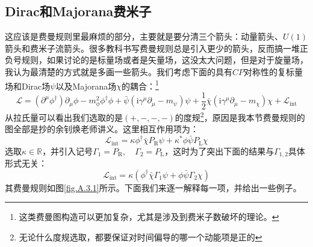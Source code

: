\subsection{Dirac和Majorana费米子}
这应该是费曼规则里最麻烦的部分，主要就是要分清三个箭头：动量箭头、$U(1)$箭头和费米子流箭头。很多教科书写费曼规则总是引入更少的箭头，反而搞一堆正负号规则，如果讨论的是标量场或者是矢量场，这没太大问题，但是对于旋量场，我认为最清楚的方式就是多画一些箭头。我们考虑下面的具有$CP$对称性的复标量场和Dirac场$\psi$以及Majorana场$\chi$的耦合：\footnote{这类费曼图构造可以更加复杂，尤其是涉及到费米子数破坏的理论。}
\begin{equation}\label{A.3.1}
	\mathcal{L}=(\partial^\mu\phi^\dagger)\partial_\mu\phi-m_\phi^2\phi^\dagger\phi+\bar{\psi}(\mathrm{i}\gamma^\mu\partial_\mu-m_\psi)\psi+\frac12\bar{\chi}(\mathrm{i}\gamma^\mu\partial_\mu-m_\chi)\chi+\mathcal{L}_\mathrm{int}
\end{equation}
从拉氏量可以看出我们选取的是$(+,-,-,-)$的度规\footnote{无论什么度规选取，都要保证对时间偏导的哪一个动能项是正的}，原因是我本节费曼规则的图全部是抄的余钊焕老师讲义。这里相互作用项为：
\begin{equation}
	\mathcal{L}_\mathrm{int}=\kappa\phi^\dagger\bar{\chi}P_\mathrm{R}\psi+\kappa^*\phi\bar{\psi}P_\mathrm{L}\chi 
\end{equation}
选取$\kappa\in\mathbb{R}$，并引入记号$\Gamma_1=P_\mathrm{R},\quad\Gamma_2=P_\mathrm{L}$，这时为了突出下面的结果与$\Gamma_{1,2}$具体形式无关：
\begin{equation}
	\mathcal{L}_{\mathrm{int}}=\kappa(\phi^\dagger\bar{\chi}\Gamma_1\psi+\phi\bar{\psi}\Gamma_2\chi)
\end{equation}
其费曼规则如图\ref{fig.A.3.1}所示。下面我们来逐一解释每一项，并给出一些例子。

